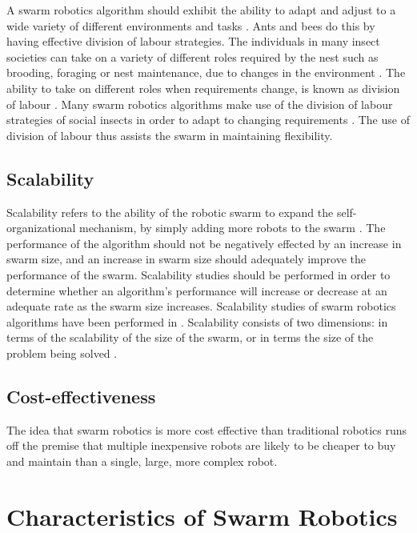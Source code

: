 A swarm robotics algorithm should exhibit the ability to adapt and adjust to a wide variety of different environments and tasks \cite{brambilla2013swarm}. Ants and bees do this by having effective division of labour strategies. The individuals in many insect societies can take on a variety of different roles required by the nest such as brooding, foraging or nest maintenance, due to changes in the environment \cite{morley1946division}. The ability to take on different roles when requirements change, is known as division of labour \cite{beshers2001models}. Many swarm robotics algorithms make use of the division of labour strategies of social insects in order to adapt to changing requirements  \cite{gerkey2004formal, labella2006division, liu2007towards}. The use of division of labour thus assists the swarm in maintaining flexibility.

\subsection{Scalability}
\label{sr:scalabilty}
Scalability refers to the ability of the robotic swarm to expand the self-organizational mechanism, by simply adding more robots to the swarm \cite{brambilla2013swarm}. The performance of the algorithm should not be negatively effected by an increase in swarm size, and an increase in swarm size should adequately improve the performance of the swarm. Scalability studies should be performed in order to determine whether an algorithm's performance will increase or decrease at an adequate rate as the swarm size increases. Scalability studies of swarm robotics algorithms have been performed in \cite{bahgecci2005evolving,nouyan2008path,zarzhitsky2005distributed}.
Scalability consists of two dimensions: in terms of the scalability of the size of the swarm, or in terms the size of the problem being solved \cite{brambilla2013swarm}.

\subsection{Cost-effectiveness}
The idea that swarm robotics is more cost effective than traditional robotics runs off the premise that multiple inexpensive robots are likely to be cheaper to buy and maintain than a single, large, more complex robot. 

\section{Characteristics of Swarm Robotics}
\label{characteristics}

